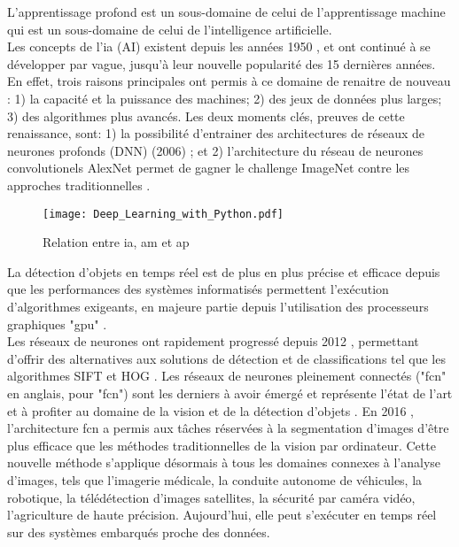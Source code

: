 ﻿\noindent L’apprentissage profond est un sous-domaine de celui de l'apprentissage machine qui est un sous-domaine de celui de l'intelligence artificielle. 
\vspace{0.5\baselineskip}
\\
\noindent Les concepts de l'\lowercase{\acrlong{ia}} (AI) existent depuis les années 1950 \parencite{chollet_deep_2018, alom_history_2018}, et ont continué à se développer par vague, jusqu'à leur nouvelle popularité des 15 dernières années. En effet, trois raisons principales ont permis à ce domaine de renaitre de nouveau \parencite[p.~20]{chollet_deep_2018}: 1) la capacité et la puissance des machines; 2) des jeux de données plus larges; 3) des algorithmes plus avancés. Les deux moments clés, preuves de cette renaissance, sont: 1) la possibilité d'entrainer des architectures de réseaux de neurones profonds (DNN) (2006) \parencite[p.~6]{alom_history_2018}; et 2) l'architecture du réseau de neurones convolutionels AlexNet permet de gagner le challenge ImageNet contre les approches traditionnelles \parencite[p.~11]{alom_history_2018}. 
\begin{figure}[H]
   \centering
   \texttt{[image: Deep\_Learning\_with\_Python.pdf]}
   \caption[Relation entre \acrlong{ia}, \acrlong{am} et \acrlong{ap}]{Relation entre \acrlong{ia}, \acrlong{am} et \acrlong{ap} \parencite[p.~4]{chollet_deep_2018}}
   \label{fig:ia_ml_ap}
\end{figure}
\noindent La détection d'objets en temps réel est de plus en plus précise et efficace depuis que les performances des systèmes informatisés permettent l'exécution d'algorithmes exigeants, en majeure partie depuis l'utilisation des processeurs graphiques "\acrshort{gpu}" \parencite{chong_real-time_1992, dettmers_deep_2015, beam_deep_2017, jiaconda_concise_2019, zheng_real-time_2020, kurenkov_brief_2015}. 
\vspace{0.5\baselineskip}
\\
\noindent Les réseaux de neurones ont rapidement progressé depuis 2012 \parencite{beam_deep_2017}, permettant d'offrir des alternatives aux solutions de détection et de classifications tel que les algorithmes SIFT et HOG \parencite{pathak_architecturally_2019}. Les réseaux de neurones pleinement connectés ("\acrshort{fcn}" en anglais, pour "\acrlong{fcn}") sont les derniers à avoir émergé et représente l'état de l'art \parencite{zheng_real-time_2020} et à profiter au domaine de la vision et de la détection d'objets \parencite{nguyen_mavnet_2019, zheng_real-time_2020}. En 2016 \parencite[p.~14]{alom_history_2018}, l'architecture \acrshort{fcn} a permis aux tâches réservées à la segmentation d'images d'être plus efficace que les méthodes traditionnelles de la vision par ordinateur. Cette nouvelle méthode s'applique désormais à tous les domaines connexes à l'analyse d'images, tels que l'imagerie médicale, la conduite autonome de véhicules, la robotique, la télédétection d'images satellites, la sécurité par caméra vidéo, l'agriculture de haute précision. Aujourd'hui, elle peut s'exécuter en temps réel sur des systèmes embarqués proche des données. 
